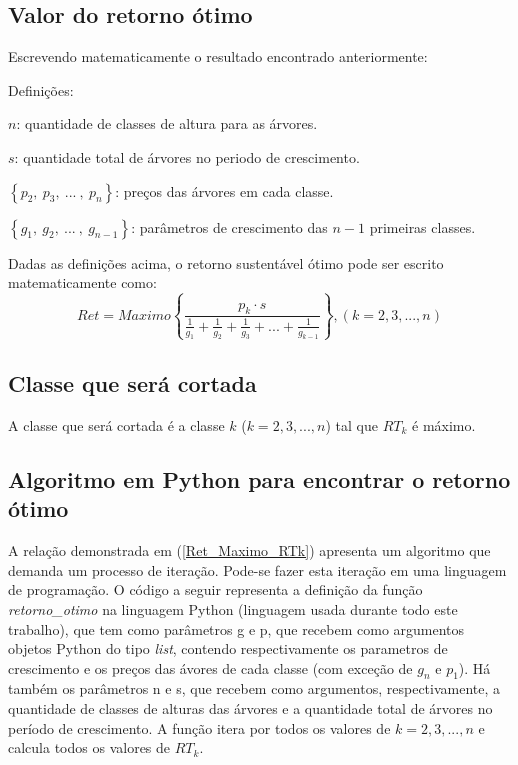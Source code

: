 \documentclass[a4paper, 12pt]{article}
\begin{document}
\subsection{Valor do retorno ótimo}
Escrevendo matematicamente o resultado encontrado anteriormente:\newline

Definições:

$n$: quantidade de classes de altura para as árvores.

$s$: quantidade total de árvores no periodo de crescimento.

$\left\{p_2{,}\ p_3{,}\ ...\ {,}\ p_n\right\} $: preços das árvores em cada classe.

$\left\{g_1{,}\ g_2{,}\ ...\ {,}\ g_{n-1}\right\}$: parâmetros de crescimento das $n-1$ primeiras classes.\newline

Dadas as definições acima, o retorno sustentável ótimo pode ser escrito matematicamente como:
\begin{equation}\label{Ret_Maximo_RTk}
    Ret=Maximo\left\{\frac{p_k\cdot s}{\frac{1}{g_1}+\frac{1}{g_2}+\frac{1}{g_3}+...+\frac{1}{g_{k-1}}}\right\}, (k = 2, 3, ..., n)
\end{equation}

\subsection{Classe que será cortada}

A classe que será cortada é a classe $k$ ($k=2, 3, ..., n$) tal que $RT_k$ é máximo. 

\subsection{Algoritmo em Python para encontrar o retorno ótimo}

A relação demonstrada em (\ref{Ret_Maximo_RTk}) apresenta um algoritmo que demanda um processo de iteração. Pode-se fazer esta iteração em uma linguagem de programação. O código a seguir representa a definição da função \emph{retorno\_otimo} na linguagem Python (linguagem usada durante todo este trabalho), que tem como parâmetros g e p, que recebem como argumentos objetos Python do tipo \emph{list}, contendo respectivamente os parametros de crescimento e os preços das ávores de cada classe (com exceção de $g_n$ e $p_1$). Há também os parâmetros n e s, que recebem como argumentos, respectivamente, a quantidade de classes de alturas das árvores e a quantidade total de árvores no período de crescimento. A função itera por todos os valores de $k=2, 3, ..., n$ e calcula todos os valores de $RT_k$.\newline
\end{document}
